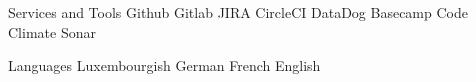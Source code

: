 \begin{cvskills}
  
  \cvskill
    {Services and Tools} %
    {Github {\enskip\cdotp\enskip} Gitlab {\enskip\cdotp\enskip} JIRA {\enskip\cdotp\enskip} CircleCI {\enskip\cdotp\enskip} DataDog {\enskip\cdotp\enskip} Basecamp {\enskip\cdotp\enskip} Code Climate {\enskip\cdotp\enskip} Sonar} %

  \cvskill
    {Languages} %
    {Luxembourgish {\enskip\cdotp\enskip} German {\enskip\cdotp\enskip} French {\enskip\cdotp\enskip} English} %



\end{cvskills}
